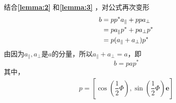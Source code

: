 结合\textbf{\ref{lemma:2}} 和\textbf{\ref{lemma:3}} ，对公式再次变形
\begin{align}
	b & = pp^* a_\parallel + pp a_\perp \notag\\
	&= p a_\parallel p^* + p a_\perp p^* \\
	&= p(a_\parallel + a_\perp)p^*
\end{align}
由因为$a_\parallel, a_\perp$是$a$的分量，所以$a_\parallel + a_\perp = a$，即
\begin{equation}
	b = p a p^*
\end{equation}
其中，
\begin{align}
	p = \left[ \cos \left( \dfrac{1}{2} \varPhi \right), \sin \left( \dfrac{1}{2} \varPhi \right) \bm{e} \right]
\end{align}

















